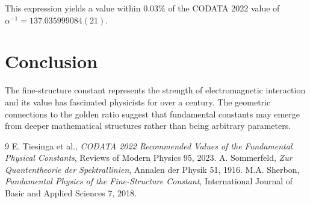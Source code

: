 This expression yields a value within $0.03\%$ of the CODATA 2022 value of $\alpha^{-1} = 137.035999084(21)$.

\section{Conclusion}

The fine-structure constant represents the strength of electromagnetic interaction and its value has fascinated physicists for over a century. The geometric connections to the golden ratio suggest that fundamental constants may emerge from deeper mathematical structures rather than being arbitrary parameters.


\begin{thebibliography}{9}
 E. Tiesinga et al., \textit{CODATA 2022 Recommended Values of the Fundamental Physical Constants}, Reviews of Modern Physics 95, 2023.
 A. Sommerfeld, \textit{Zur Quantentheorie der Spektrallinien}, Annalen der Physik 51, 1916.
 M.A. Sherbon, \textit{Fundamental Physics of the Fine-Structure Constant}, International Journal of Basic and Applied Sciences 7, 2018.
\end{thebibliography}
